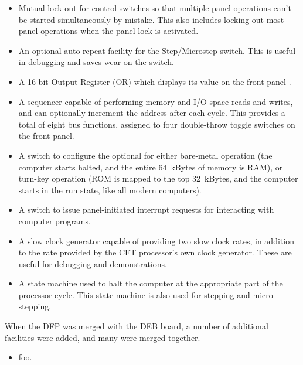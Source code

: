 \begin{itemize}
\item Mutual lock-out for control switches so that multiple panel
  operations can't be started simultaneously by mistake. This also
  includes locking out most panel operations when the panel lock is
  activated.

\item An optional auto-repeat facility for the Step/Microstep
  switch. This is useful in debugging and saves wear on the switch.

\item A 16-bit Output Register (OR) which displays its value on the
  front panel .

\item A sequencer capable of performing memory and I/O space reads and
  writes, and can optionally increment the address after each
  cycle. This provides a total of eight bus functions, assigned to
  four double-throw toggle switches on the front panel.

\item A switch to configure the optional  for either
  bare-metal operation (the computer starts halted, and the entire
  64~kBytes of memory is RAM), or turn-key operation (ROM is mapped to
  the top 32~kBytes, and the computer starts in the run state, like
  all modern computers).

\item A switch to issue panel-initiated interrupt requests for
  interacting with computer programs.

\item A slow clock generator capable of providing two slow clock
  rates, in addition to the rate provided by the CFT processor's own
  clock generator. These are useful for debugging and demonstrations.
  
\item A state machine used to halt the computer at the appropriate
  part of the processor cycle. This state machine is also used for
  stepping and micro-stepping.

\end{itemize}

When the DFP was merged with the DEB board, a number of additional
facilities were added, and many were merged together.

\begin{itemize}

\item foo.

\end{itemize}


